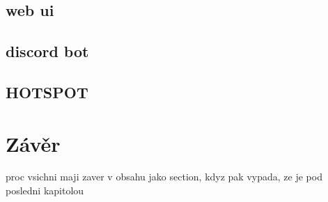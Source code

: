\documentclass{template/socthesis}
\begin{document}
\section{web ui}
\section{discord bot}
\section{HOTSPOT}


\newpage
\chapter*{Závěr}
proc vsichni maji zaver v obsahu jako section, kdyz pak vypada, ze je pod posledni kapitolou

\newpage
\printbibliography[title=Literatura]

\listoffigures
{}

\listoftables
{}
%
\end{document}
